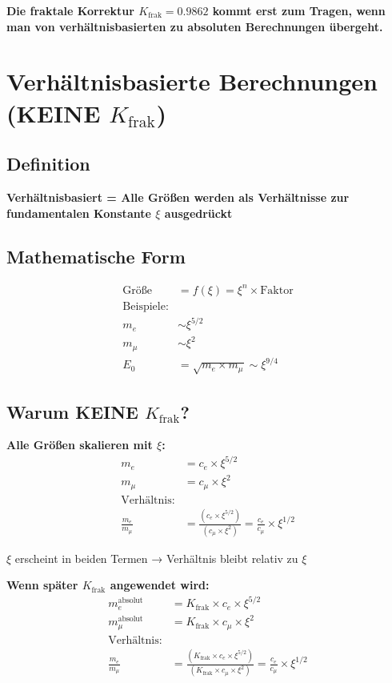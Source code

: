 \documentclass[12pt,a4paper]{article}
\begin{document}
	\textbf{Die fraktale Korrektur $K_{\text{frak}} = 0.9862$ kommt erst zum Tragen, wenn man von verhältnisbasierten zu absoluten Berechnungen übergeht.}
	
	\section{Verhältnisbasierte Berechnungen (KEINE $K_{\text{frak}}$)}
	
	\subsection{Definition}
	
	\textbf{Verhältnisbasiert = Alle Größen werden als Verhältnisse zur fundamentalen Konstante $\xi$ ausgedrückt}
	
	\subsection{Mathematische Form}
	\begin{align*}
		\text{Größe} &= f(\xi) = \xi^n \times \text{Faktor} \\
		\text{Beispiele:} & \\
		m_e &\sim \xi^{5/2} \\
		m_μ &\sim \xi^2 \\
		E_0 &= \sqrt{m_e \times m_μ} \sim \xi^{9/4}
	\end{align*}
	
	\subsection{Warum KEINE $K_{\text{frak}}$?}
	
	\textbf{Alle Größen skalieren mit $\xi$:}
	\begin{align*}
		m_e &= c_e \times \xi^{5/2} \\
		m_μ &= c_μ \times \xi^2 \\
		\text{Verhältnis:} & \\
		\frac{m_e}{m_μ} &= \frac{(c_e \times \xi^{5/2})}{(c_μ \times \xi^2)} = \frac{c_e}{c_μ} \times \xi^{1/2}
	\end{align*}
	
	$\xi$ erscheint in beiden Termen → Verhältnis bleibt relativ zu $\xi$
	
	\textbf{Wenn später $K_{\text{frak}}$ angewendet wird:}
	\begin{align*}
		m_e^{\text{absolut}} &= K_{\text{frak}} \times c_e \times \xi^{5/2} \\
		m_μ^{\text{absolut}} &= K_{\text{frak}} \times c_μ \times \xi^2 \\
		\text{Verhältnis:} & \\
		\frac{m_e}{m_μ} &= \frac{(K_{\text{frak}} \times c_e \times \xi^{5/2})}{(K_{\text{frak}} \times c_μ \times \xi^2)} = \frac{c_e}{c_μ} \times \xi^{1/2}
	\end{align*}
	
\end{document}
